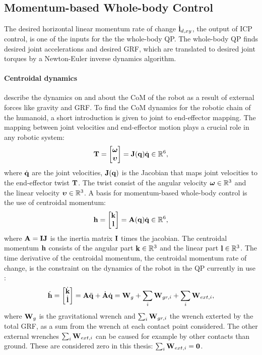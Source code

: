 \subsection{Momentum-based Whole-body Control}
The desired horizontal linear momentum rate of change $\dot{\mathbf{l}}_{d,xy}$, the output of \ac{ICP} control, is one of the inputs for the the whole-body \ac{QP}. The whole-body \ac{QP} finds desired joint accelerations and desired \ac{GRF}, which are translated to desired joint torques by a Newton-Euler inverse dynamics algorithm.
\paragraph{Centroidal dynamics} \cite{orin2013centroidal} describe the dynamics on and about the \ac{CoM} of the robot as a result of external forces like gravity and \ac{GRF}. To find the \ac{CoM} dynamics for the robotic chain of the humanoid, a short introduction is given to joint to end-effector mapping. The mapping between joint velocities and end-effector motion plays a crucial role in any robotic system:
\begin{equation}\label{eq:jacobian}
\mathbf{T}=\begin{bmatrix}\boldsymbol{\omega} \\ \boldsymbol{\upsilon} \end{bmatrix} = \mathbf{J}(\mathbf{q})\dot{\mathbf{q}} \in \mathbb{R}^6,
\end{equation}
where $\dot{\mathbf{q}}$ are the joint velocities, $\mathbf{J}(\mathbf{q})$ is the Jacobian that maps joint velocities to the end-effector twist $\mathbf{T}$. The twist consist of the angular velocity $\boldsymbol{\omega} \in \mathbb{R}^3$ and the linear velocity $\boldsymbol{\upsilon} \in \mathbb{R}^3$. A basis for momentum-based whole-body control is the use of centroidal momentum:
\begin{equation}
\mathbf{h}=\begin{bmatrix}\mathbf{k} \\ \mathbf{l} \end{bmatrix} =\mathbf{A}(\mathbf{q})\dot{\mathbf{q}} \in \mathbb{R}^6,
\end{equation}
 where $\mathbf{A}=\mathbf{I}\mathbf{J}$ is the inertia matrix $\mathbf{I}$ times the jacobian. The centroidal momentum $\mathbf{h}$ consists of the angular part $\mathbf{k} \in \mathbb{R}^3$ and the linear part $\mathbf{l} \in \mathbb{R}^3$. The time derivative of the centroidal momentum, the centroidal momentum rate of change, is the constraint on the dynamics of the robot in the \ac{QP} currently in use \cite{koolen2016design}:
\begin{equation}
\dot{\mathbf{h}}=\begin{bmatrix}\dot{\mathbf{k}}\\ \dot{\mathbf{l}} \end{bmatrix} =\mathbf{A}\ddot{\mathbf{q}} +\dot{\mathbf{A}}\dot{\mathbf{q}} = \mathbf{W}_g + \sum_i\mathbf{W}_{gr,i} + \sum_i \mathbf{W}_{ext,i}, 
\end{equation}
where $\mathbf{W}_g$ is the gravitational wrench and $\sum_i\mathbf{W}_{gr,i}$ the wrench exterted by the total \ac{GRF}, as a sum from the wrench at each contact point considered. The other external wrenches $\sum_i \mathbf{W}_{ext,i}$ can be caused for example by other contacts than ground. These are considered zero in this thesis: $\sum_i \mathbf{W}_{ext,i}=\mathbf{0}$.
